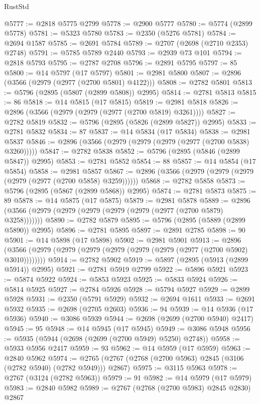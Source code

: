 \begin{lexlean}{RustStd}
\begin{coremodule}
@5777 := @2818 @5775 @2799
@5778 := @2900 @5777
@5780 := @5774 (@2899 @5778)
@5781 := @5323 @5780
@5783 := @2350 (@5276 @5781)
@5784 := @2694 @1587
@5785 := @2691 @5784
@5789 := @2707 (@2698 (@2710 @2353) @2748)
@5791 := @5785 @5789 @2440
@5793 := @2939 @73 @101
@5794 := @2818 @5793
@5795 := @2787 @2708
@5796 := @2891 @5795
@5797 := 85
@5800 := @14 @5797 (@17 @5797)
@5801 := @2981 @5800
@5807 := @2896 (@3566 (@2979 (@2977 (@2700 @5801) @4122)))
@5808 := @2782 @5801
@5813 := @5796 (@2895 (@5807 (@2899 @5808)) @2995)
@5814 := @2781 @5813
@5815 := 86
@5818 := @14 @5815 (@17 @5815)
@5819 := @2981 @5818
@5826 := @2896 (@3566 (@2979 (@2979 (@2977 (@2700 @5819) @3261))))
@5827 := @2782 @5819
@5832 := @5796 (@2895 (@5826 (@2899 @5827)) @2995)
@5833 := @2781 @5832
@5834 := 87
@5837 := @14 @5834 (@17 @5834)
@5838 := @2981 @5837
@5846 := @2896 (@3566 (@2979 (@2979 (@2979 (@2977 (@2700 @5838) @3260)))))
@5847 := @2782 @5838
@5852 := @5796 (@2895 (@5846 (@2899 @5847)) @2995)
@5853 := @2781 @5852
@5854 := 88
@5857 := @14 @5854 (@17 @5854)
@5858 := @2981 @5857
@5867 := @2896 (@3566 (@2979 (@2979 (@2979 (@2979 (@2977 (@2700 @5858) @3259))))))
@5868 := @2782 @5858
@5873 := @5796 (@2895 (@5867 (@2899 @5868)) @2995)
@5874 := @2781 @5873
@5875 := 89
@5878 := @14 @5875 (@17 @5875)
@5879 := @2981 @5878
@5889 := @2896 (@3566 (@2979 (@2979 (@2979 (@2979 (@2979 (@2977 (@2700 @5879) @3258)))))))
@5890 := @2782 @5879
@5895 := @5796 (@2895 (@5889 (@2899 @5890)) @2995)
@5896 := @2781 @5895
@5897 := @2891 @2785
@5898 := 90
@5901 := @14 @5898 (@17 @5898)
@5902 := @2981 @5901
@5913 := @2896 (@3566 (@2979 (@2979 (@2979 (@2979 (@2979 (@2979 (@2977 (@2700 @5902) @3010))))))))
@5914 := @2782 @5902
@5919 := @5897 (@2895 (@5913 (@2899 @5914)) @2995)
@5921 := @2781 @5919 @2799
@5922 := @5896 @5921
@5923 := @5874 @5922
@5924 := @5853 @5923
@5925 := @5833 @5924
@5926 := @5814 @5925
@5927 := @2784 @5926
@5928 := @5794 @5927
@5929 := @2899 @5928
@5931 := @2350 (@5791 @5929)
@5932 := @2694 @1611
@5933 := @2691 @5932
@5935 := @2698 (@2705 @2603)
@5936 := 94
@5939 := @14 @5936 (@17 @5936)
@5940 := @3086 @5939
@5944 := @2698 (@2699 (@2700 @5940) @2417)
@5945 := 95
@5948 := @14 @5945 (@17 @5945)
@5949 := @3086 @5948
@5956 := @5935 (@5944 (@2698 (@2699 (@2700 @5949) @5250) @2748))
@5958 := @5933 @5956 @2417
@5959 := 93
@5962 := @14 @5959 (@17 @5959)
@5963 := @2840 @5962
@5974 := @2765 (@2767 (@2768 (@2700 @5963) @2845 (@3106 (@2782 @5940) (@2782 @5949))) @2867)
@5975 := @3115 @5963
@5978 := @2767 (@3124 (@2782 @5963))
@5979 := 91
@5982 := @14 @5979 (@17 @5979)
@5983 := @2840 @5982
@5989 := @2767 (@2768 (@2700 @5983) @2845 @2830) @2867

\end{coremodule}
\end{lexlean}
